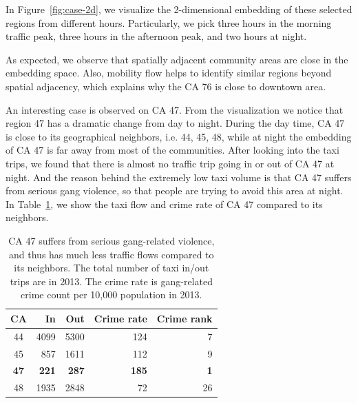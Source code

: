 In Figure~\ref{fig:case-2d}, we visualize the 2-dimensional embedding of these selected regions from different hours. Particularly, we pick three hours in the morning traffic peak, three hours in the afternoon peak, and two hours at night. 

As expected, we observe that spatially adjacent community areas are close in the \hdge embedding space. Also, mobility flow helps to identify similar regions beyond spatial adjacency, which explains why the CA 76 is close to downtown area.



An interesting case is observed on CA 47. From the visualization we notice that region 47 has a dramatic change from day to night. During the day time, CA 47 is close to its geographical neighbors, i.e. 44, 45, 48, while at night the embedding of CA 47 is far away from most of the communities. After looking into the taxi trips, we found that there is almost no traffic trip going in or out of CA 47 at night. And the reason behind the extremely low taxi volume is that CA 47 suffers from serious gang violence, so that people are trying to avoid this area at night. In Table~\ref{tab:trip-count}, we show the taxi flow and crime rate of CA 47 compared to its neighbors.




\begin{table}[h]
\centering
\caption{CA 47 suffers from serious gang-related violence, and thus has much less traffic flows compared to its neighbors. The total number of taxi in/out trips are in 2013. The crime rate is gang-related crime count per 10,000 population in 2013.}
\label{tab:trip-count}
\begin{tabular}{|c|r|r|r|r|}
\hline
CA & In & Out & Crime rate & Crime rank\\ \hline
44 & 4099 & 5300 & 124 & 7\\ \hline
45 & 857 & 1611 & 112 & 9\\ \hline
\textbf{47} & \textbf{221} & \textbf{287} & \textbf{185} & \textbf{1}\\ \hline
48 & 1935 & 2848 & 72 & 26 \\ \hline
\end{tabular}
\end{table}







